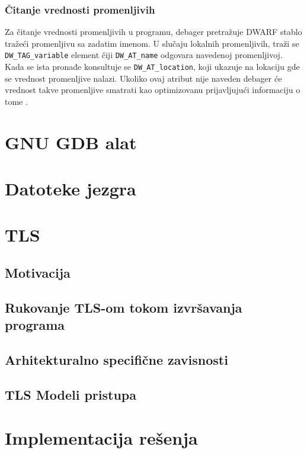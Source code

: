 \documentclass[12pt,oneside]{memoir}
\begin{document}
\subsection{Čitanje vrednosti promenljivih}

Za čitanje vrednosti promenljivih u programu, debager pretražuje DWARF stablo tražeći promenljivu sa zadatim imenom. U slučaju lokalnih promenljivih, traži se \texttt{DW\_TAG\_variable} element čiji \texttt{DW\_AT\_name} odgovara navedenoj promenljivoj. Kada se ista pronađe konsultuje se \texttt{DW\_AT\_location}, koji ukazuje na lokaciju gde se vrednost promenljive nalazi. Ukoliko ovaj atribut nije naveden debager će vrednost takve promenljive smatrati kao optimizovanu prijavljujući informaciju o tome \cite{GDB}.


\chapter{GNU GDB alat}
\label{chp:GDB}

\chapter{Datoteke jezgra}
\label{chp:corefiles}

\chapter{TLS}
\label{chp:TLS}


\section{Motivacija}
\section{Rukovanje TLS-om tokom izvršavanja programa}
\section{Arhitekturalno specifične zavisnosti}
\section{TLS Modeli pristupa}

\chapter{Implementacija rešenja}
\label{chp:Implementacija}
\end{document}
